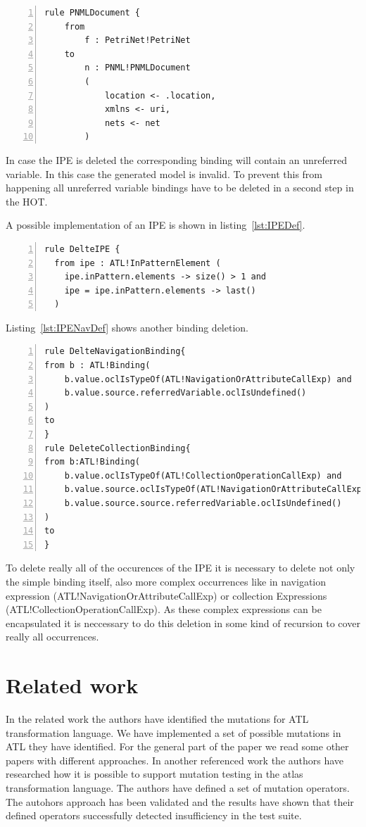 \documentclass{llncs}
\begin{document}
\begin{lstlisting}[language=ATL, numbers=left,xleftmargin=5.0ex,label=lst:pnmldoc2,caption=Rule with removed IPE]
rule PNMLDocument {
	from
		f : PetriNet!PetriNet
	to	
		n : PNML!PNMLDocument
		(
			location <- .location,
			xmlns <- uri,
			nets <- net			
		)
\end{lstlisting}

In case the IPE is deleted the corresponding binding will contain an unreferred variable. In this case the generated model is invalid. To prevent this from happening all unreferred variable bindings have to be deleted in a second step in the HOT.

A possible implementation of an IPE is shown in listing~\ref{lst:IPEDef}.

\begin{lstlisting}[language=ATL, numbers=left,xleftmargin=5.0ex,label=lst:IPEDef,caption=Delete IPE]
rule DelteIPE {
  from ipe : ATL!InPatternElement (
    ipe.inPattern.elements -> size() > 1 and
    ipe = ipe.inPattern.elements -> last()
  )
\end{lstlisting}

Listing~\ref{lst:IPENavDef} shows another binding deletion.

\begin{lstlisting}[language=ATL, numbers=left,xleftmargin=5.0ex,label=lst:IPENavDef,caption=Delete bindings after deleting an IPE]
rule DelteNavigationBinding{
from b : ATL!Binding(
	b.value.oclIsTypeOf(ATL!NavigationOrAttributeCallExp) and 
	b.value.source.referredVariable.oclIsUndefined()
)
to
}
rule DeleteCollectionBinding{
from b:ATL!Binding(		
	b.value.oclIsTypeOf(ATL!CollectionOperationCallExp) and 
	b.value.source.oclIsTypeOf(ATL!NavigationOrAttributeCallExp) and 
	b.value.source.source.referredVariable.oclIsUndefined()
)
to
}
\end{lstlisting}

To delete really all of the occurences of the IPE it is necessary to delete not only the simple binding itself, also more complex occurrences like in navigation expression (ATL!NavigationOrAttributeCallExp) or collection Expressions (ATL!CollectionOperationCallExp).
As these complex expressions can be encapsulated it is neccessary to do this deletion in some kind of recursion to cover really all occurrences.

\section{Related work}
In the related work \cite{troya:2015} the authors have identified the mutations
for ATL transformation language. We have implemented a set of possible mutations in ATL they have identified. For the general part of the paper we read some other papers with different approaches.
In another referenced work \cite{book:KhanHassine} the authors have researched
how it is possible to support mutation testing in the atlas transformation
language. The authors have defined a set of mutation operators. The autohors approach has been validated and the results have shown that their
defined operators successfully detected insufficiency in the test suite.
\end{document}
